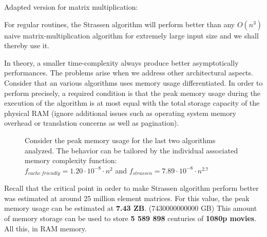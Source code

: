 \begin{pitfall}
Adapted version for matrix multiplication: 

For regular routines, the Strassen algorithm will perform better than any $O(n^3)$ naive matrix-multiplication algorithm for extremely large input size and we shall thereby use it.
\end{pitfall}

In theory, a smaller time-complexity always produce better asymptotically performances. The problems arise when we address other architectural aspects. Consider that an various algorithms uses memory usage differentiated. In order to perform precisely, a required condition is that the peak memory usage during the execution of the algorithm is at most equal with the total storage capacity of the physical RAM (ignore additional issues such as operating system memory overhead or translation concerns as well as pagination). 


\begin{figure}[H]
\caption{ Consider the peak memory usage for the last two algorithms analyzed. The behavior can be tailored by the individual associated memory complexity function: \\ $f_{cache\ friendly} = 1.20 \cdot 10^{-8} \cdot n^2 $ and  $f_{strassen} = 7.89 \cdot 10^{-8} \cdot n^{2.7} $ } 
\end{figure}

Recall that the critical point in order to make Strassen algorithm perform better was estimated at around 25 million element matrices. For this value, the peak memory usage can be estimated at \textbf{7.43 ZB}. (7430000000000 GB)
This amount of memory storage can be used to store \textbf{5 589 898} centuries of \textbf{1080p movies}. All this, in RAM memory.

